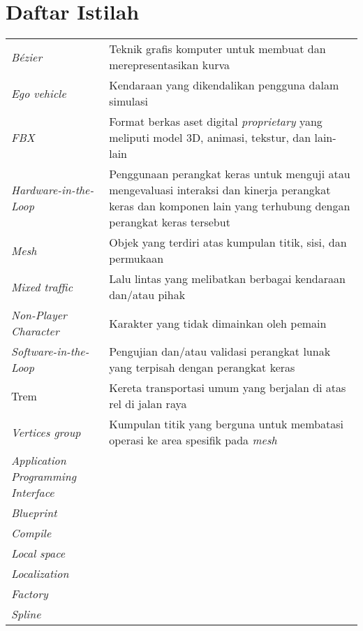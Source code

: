 \chapter*{Daftar Istilah}

\begingroup
\def\arraystretch{1.25}
\begin{onehalfspace}
\begin{longtable}{p{} p{}}
	\textit{Bézier} & Teknik grafis komputer untuk membuat dan merepresentasikan kurva \\
	\textit{Ego vehicle} & Kendaraan yang dikendalikan pengguna dalam simulasi \\
	\textit{FBX} & Format berkas aset digital \textit{proprietary} yang meliputi model 3D, animasi, tekstur, dan lain-lain \\
	\textit{Hardware-in-the-Loop} & Penggunaan perangkat keras untuk menguji atau mengevaluasi interaksi dan kinerja perangkat keras dan komponen lain yang terhubung dengan perangkat keras tersebut \\
	\textit{Mesh} & Objek yang terdiri atas kumpulan titik, sisi, dan permukaan \\
	\textit{Mixed traffic} & Lalu lintas yang melibatkan berbagai kendaraan dan/atau pihak \\
	\textit{Non-Player Character} & Karakter yang tidak dimainkan oleh pemain \\
	\textit{Software-in-the-Loop} & Pengujian dan/atau validasi perangkat lunak yang terpisah dengan perangkat keras \\
	Trem & Kereta transportasi umum yang berjalan di atas rel di jalan raya \\
	\textit{Vertices group} & Kumpulan titik yang berguna untuk membatasi operasi ke area spesifik pada \textit{mesh} \\

	\textit{Application Programming Interface} & \\
	\textit{Blueprint} &  \\
	\textit{Compile} & \\
	\textit{Local space} & \\
	\textit{Localization} & \\
	\textit{Factory} &  \\
	\textit{Spline} &  \\



\end{longtable}
\end{onehalfspace}
